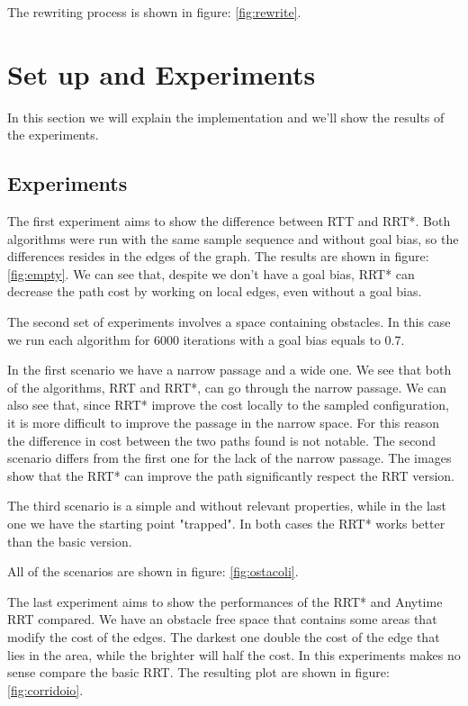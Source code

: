 \documentclass[10pt]{article}
\begin{document}
	The rewriting process is shown in figure: \ref{fig:rewrite}.

	
	\section{Set up and Experiments}
	In this section we will explain the implementation and we'll show the results of the experiments.

	\subsection{Experiments}
	
	The first experiment aims to show the difference between RTT and RRT*. Both algorithms were run with the same sample sequence and without goal bias, so the differences resides in the edges of the graph. The results are shown in figure: \ref{fig:empty}. We can see that, despite we don't have a goal bias, RRT* can decrease the path cost by working on local edges, even without a goal bias.
	
	The second set of experiments involves a space containing obstacles. In this case we run each algorithm for 6000 iterations with a goal bias equals to 0.7.
	
	In the first scenario we have a narrow passage and a wide one. We see that both of the algorithms, RRT and RRT*, can go through the narrow passage. We can also see that, since RRT* improve the cost locally to the sampled configuration, it is more difficult to improve the passage in the narrow space. For this reason the difference in cost between the two paths found is not notable. The second scenario differs from the first one for the lack of the narrow passage. The images show that the RRT* can improve the path significantly respect the RRT version.
	
	The third scenario is a simple and without relevant properties, while in the last one we have the starting point "trapped". In both cases the RRT* works better than the basic version.
	
	All of the scenarios are shown in figure: \ref{fig:ostacoli}.
	
	The last experiment aims to show the performances of the RRT* and Anytime RRT compared. We have an obstacle free space that contains some areas that modify the cost of the edges. The darkest one double the cost of the edge that lies in the area, while the brighter will half the cost. In this experiments makes no sense compare the basic RRT. The resulting plot are shown in figure: \ref{fig:corridoio}. 
	
\end{document}
